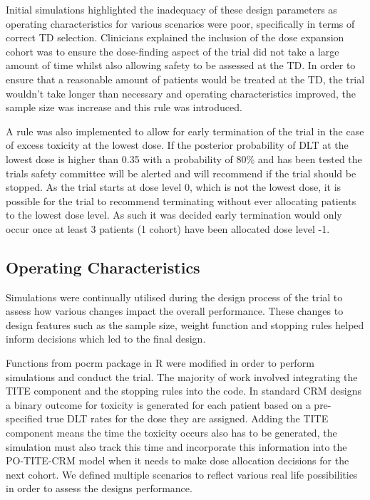 Initial simulations highlighted the inadequacy of these design parameters as operating characteristics for various scenarios were poor, specifically in terms of correct TD selection. Clinicians explained the inclusion of the dose expansion cohort was to ensure the dose-finding aspect of the trial did not take a large amount of time whilst also allowing safety to be assessed at the TD. In order to ensure that a reasonable amount of patients would be treated at the TD, the trial wouldn't take longer than necessary and operating characteristics improved, the sample size was increase and this rule was introduced.

A rule was also implemented to allow for early termination of the trial in the case of excess toxicity at the lowest dose. If the posterior probability of DLT at the lowest dose is higher than 0.35 with a probability of 80\% and has been tested the trials safety committee will be alerted and will recommend if the trial should be stopped. As the trial starts at dose level 0, which is not the lowest dose, it is possible for the trial to recommend terminating without ever allocating patients to the lowest dose level. As such it was decided early termination would only occur once at least 3 patients (1 cohort) have been allocated dose level -1. 

\subsection{Operating Characteristics}
\label{section2.3.4}%

Simulations were continually utilised during the design process of the trial to assess how various changes impact the overall performance. These changes to design features such as the sample size, weight function and stopping rules helped inform decisions which led to the final design.  

Functions from pocrm package in R \cite{wagesPocrmRpackagePhase2013, wagesPocrmDoseFinding2019} were modified in order to perform simulations and conduct the trial. The majority of work involved integrating the TITE component and the stopping rules into the code. In standard CRM designs a binary outcome for toxicity is generated for each patient based on a pre-specified true DLT rates for the dose they are assigned. Adding the TITE component means the time the toxicity occurs also has to be generated, the simulation must also track this time and incorporate this information into the PO-TITE-CRM model when it needs to make dose allocation decisions for the next cohort. We defined multiple scenarios to reflect various real life possibilities in order to assess the designs performance.  

